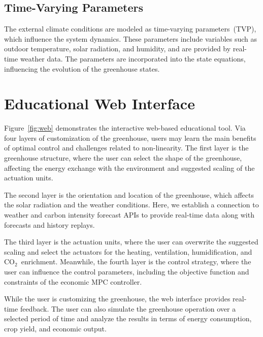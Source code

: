 \documentclass[conference]{IEEEtran}
\newcommand{\coo}{\ensuremath{\mathrm{CO_2}}}
\begin{document}
\subsection{Time-Varying Parameters}

The external climate conditions are modeled as time-varying parameters~(TVP), which influence the system dynamics. These parameters include variables such as outdoor temperature, solar radiation, and humidity, and are provided by real-time weather data. The parameters are incorporated into the state equations, influencing the evolution of the greenhouse states.

\section{Educational Web Interface}
Figure~\ref{fig:web} demonstrates the interactive web-based educational tool. Via four layers of customization of the greenhouse, users may learn the main benefits of optimal control and challenges related to non-linearity. The first layer is the greenhouse structure, where the user can select the shape of the greenhouse, affecting the energy exchange with the environment and suggested scaling of the actuation units.

The second layer is the orientation and location of the greenhouse, which affects the solar radiation and the weather conditions. Here, we establish a connection to weather and carbon intensity forecast APIs to provide real-time data along with forecasts and history replays.

The third layer is the actuation units, where the user can overwrite the suggested scaling and select the actuators for the heating, ventilation, humidification, and \coo\ enrichment. Meanwhile, the fourth layer is the control strategy, where the user can influence the control parameters, including the objective function and constraints of the economic MPC controller.

While the user is customizing the greenhouse, the web interface provides real-time feedback. The user can also simulate the greenhouse operation over a selected period of time and analyze the results in terms of energy consumption, crop yield, and economic output.
\end{document}

